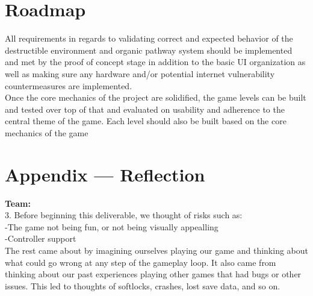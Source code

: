 \documentclass{article}
\begin{document}
\section{Roadmap}

All requirements in regards to validating correct and expected behavior of the destructible environment and organic pathway system should be implemented and met by the proof of concept stage in addition to the basic UI organization as well as making sure any hardware and/or potential internet vulnerability countermeasures are implemented. \\

Once the core mechanics of the project are solidified, the game levels can be built and tested over top of that and evaluated on usability and adherence to the central theme of the game. Each level should also be built based on the core mechanics of the game\\


\newpage{}

\section*{Appendix --- Reflection}

\textbf{Team:}\\

3. Before beginning this deliverable, we thought of risks such as:\\
-The game not being fun, or not being visually appealling\\
-Controller support\\
The rest came about by imagining ourselves playing our game and thinking about what could go wrong at any step of the gameplay loop. It also came from thinking about our past experiences playing other games that had bugs or other issues. This led to thoughts of softlocks, crashes, lost save data, and so on.\\
\end{document}
